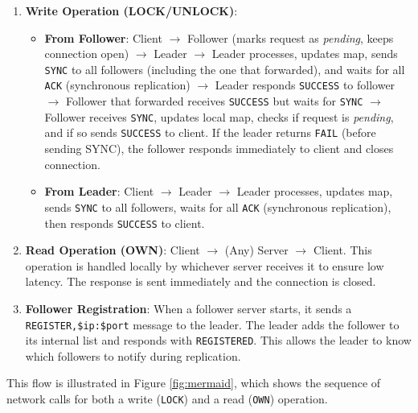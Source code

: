 \documentclass[a4paper,11pt]{article}
\begin{document}
\begin{enumerate}
    \item \textbf{Write Operation (LOCK/UNLOCK)}: 
    \begin{itemize}
        \item \textbf{From Follower}: Client $\rightarrow$ Follower (marks request as \emph{pending}, keeps connection open) $\rightarrow$ Leader $\rightarrow$ Leader processes, updates map, sends \texttt{SYNC} to all followers (including the one that forwarded), and waits for all \texttt{ACK} (synchronous replication) $\rightarrow$ Leader responds \texttt{SUCCESS} to follower $\rightarrow$ Follower that forwarded receives \texttt{SUCCESS} but waits for \texttt{SYNC} $\rightarrow$ Follower receives \texttt{SYNC}, updates local map, checks if request is \emph{pending}, and if so sends \texttt{SUCCESS} to client. If the leader returns \texttt{FAIL} (before sending SYNC), the follower responds immediately to client and closes connection.
        \item \textbf{From Leader}: Client $\rightarrow$ Leader $\rightarrow$ Leader processes, updates map, sends \texttt{SYNC} to all followers, waits for all \texttt{ACK} (synchronous replication), then responds \texttt{SUCCESS} to client.
    \end{itemize}
    \item \textbf{Read Operation (OWN)}: Client $\rightarrow$ (Any) Server $\rightarrow$ Client. This operation is handled locally by whichever server receives it to ensure low latency. The response is sent immediately and the connection is closed.
    \item \textbf{Follower Registration}: When a follower server starts, it sends a \texttt{REGISTER,\$ip:\$port} message to the leader. The leader adds the follower to its internal list and responds with \texttt{REGISTERED}. This allows the leader to know which followers to notify during replication.
\end{enumerate}

This flow is illustrated in Figure \ref{fig:mermaid}, which shows the sequence of network calls for both a write (\texttt{LOCK}) and a read (\texttt{OWN}) operation.
\end{document}
